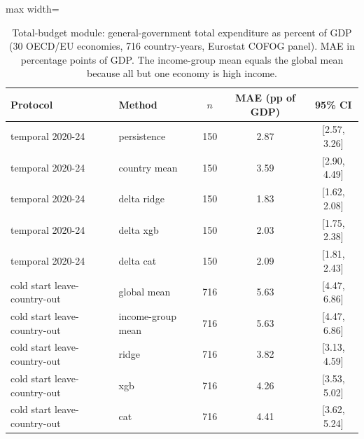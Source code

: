 \begin{table}
\caption{Total-budget module: general-government total expenditure as percent of GDP (30 OECD/EU economies, 716 country-years, Eurostat COFOG panel). MAE in percentage points of GDP. The income-group mean equals the global mean because all but one economy is high income.}\label{tab:total}
\centering\small
\renewcommand{\arraystretch}{1.1}
\begin{adjustbox}{max width=\linewidth}
\begin{tabular}{llccc}
\toprule
Protocol & Method & $n$ & MAE (pp of GDP) & 95\% CI \\
\midrule
temporal 2020-24 & persistence & 150 & 2.87 & [2.57, 3.26] \\
temporal 2020-24 & country mean & 150 & 3.59 & [2.90, 4.49] \\
temporal 2020-24 & delta ridge & 150 & 1.83 & [1.62, 2.08] \\
temporal 2020-24 & delta xgb & 150 & 2.03 & [1.75, 2.38] \\
temporal 2020-24 & delta cat & 150 & 2.09 & [1.81, 2.43] \\
cold start leave-country-out & global mean & 716 & 5.63 & [4.47, 6.86] \\
cold start leave-country-out & income-group mean & 716 & 5.63 & [4.47, 6.86] \\
cold start leave-country-out & ridge & 716 & 3.82 & [3.13, 4.59] \\
cold start leave-country-out & xgb & 716 & 4.26 & [3.53, 5.02] \\
cold start leave-country-out & cat & 716 & 4.41 & [3.62, 5.24] \\
\bottomrule
\end{tabular}\end{adjustbox}
\end{table}
